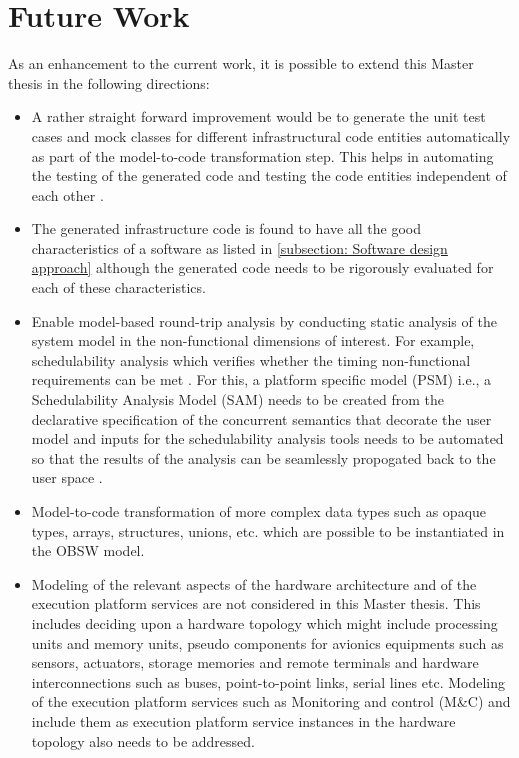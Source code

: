 \section{Future Work}
As an enhancement to the current work, it is possible to extend this Master thesis in the following directions:
\begin{itemize}
\item A rather straight forward improvement would be to generate the unit test cases and mock classes for different infrastructural code entities automatically as part of the model-to-code transformation step. This helps in automating the testing of the generated code and testing the code entities independent of each other \cite{GoogleMock}.
\item The generated infrastructure code is found to have all the good characteristics of a software as listed in \cref{subsection: Software design approach} although the generated code needs to be rigorously evaluated for each of these characteristics. 
\item Enable model-based round-trip analysis by conducting static analysis of the system model in the non-functional dimensions of interest. For example, schedulability analysis which verifies whether the timing non-functional requirements can be met \cite{ScheduAnaly}\cite{CompBasedProcess}.  For this, a platform specific model (PSM) i.e., a Schedulability Analysis Model (SAM) needs to be created from the declarative specification of the concurrent semantics that decorate the user model and inputs for the schedulability analysis tools needs to be automated so that the results of the analysis can be seamlessly propogated back to the user space \cite{ScheduAnaly}.
\item Model-to-code transformation of more complex data types such as opaque types, arrays, structures, unions, etc. which are possible to be instantiated in the OBSW model.
\item Modeling of the relevant aspects of the hardware architecture and of the execution platform services are not considered in this Master thesis. This includes deciding upon a hardware topology which might include processing units and memory units, pseudo components for avionics equipments such as sensors, actuators, storage memories and remote terminals and hardware interconnections such as buses, point-to-point links, serial lines etc. Modeling of the execution platform services such as Monitoring and control (M\&C) and include them as execution platform service instances in the hardware topology also needs to be addressed.  

\end{itemize}

